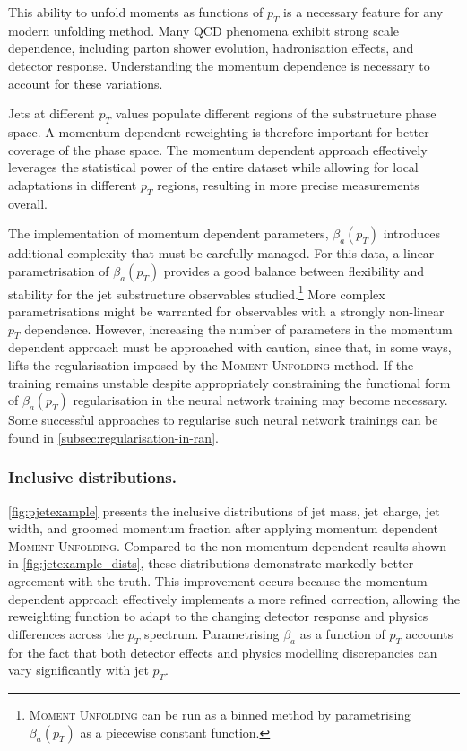         This ability to unfold moments as functions of \(p_T\) is a necessary feature for any modern unfolding method.
        Many QCD phenomena exhibit strong scale dependence, including parton shower evolution, hadronisation effects, and detector response.
        Understanding the momentum dependence is necessary to account for these variations.
        
        Jets at different \(p_T\) values populate different regions of the substructure phase space.
        A momentum dependent reweighting is therefore important for better coverage of the phase space.
        The momentum dependent approach effectively leverages the statistical power of the entire dataset while allowing for local adaptations in different \(p_T\) regions, resulting in more precise measurements overall.

        The implementation of momentum dependent parameters, \(\beta_a(p_T)\) introduces additional complexity that must be carefully managed.
        For this data, a linear parametrisation of \(\beta_a(p_T)\) provides a good balance between flexibility and stability for the jet substructure observables studied.\footnote{\textsc{Moment Unfolding} can be run as a binned method by parametrising \(\beta_a(p_T)\) as a piecewise constant function.}
        More complex parametrisations might be warranted for observables with a strongly non-linear \(p_T\) dependence.
        However, increasing the number of parameters in the momentum dependent approach must be approached with caution, since that, in some ways, lifts the regularisation imposed by the \textsc{Moment Unfolding} method.
        If the training remains unstable despite appropriately constraining the functional form of \(\beta_a(p_T)\) regularisation in the neural network training may become necessary.
        Some successful approaches to regularise such neural network trainings can be found in \cref{subsec:regularisation-in-ran}.
        
        \subsubsection{Inclusive distributions.}
            \cref{fig:pjetexample} presents the inclusive distributions of jet mass, jet charge, jet width, and groomed momentum fraction after applying momentum dependent \textsc{Moment Unfolding}.
            Compared to the non-momentum dependent results shown in \cref{fig:jetexample_dists}, these distributions demonstrate markedly better agreement with the truth.
            This improvement occurs because the momentum dependent approach effectively implements a more refined correction, allowing the reweighting function to adapt to the changing detector response and physics differences across the \(p_T\) spectrum.
            Parametrising \(\beta_a\) as a function of \(p_T\) accounts for the fact that both detector effects and physics modelling discrepancies can vary significantly with jet \(p_T\).


